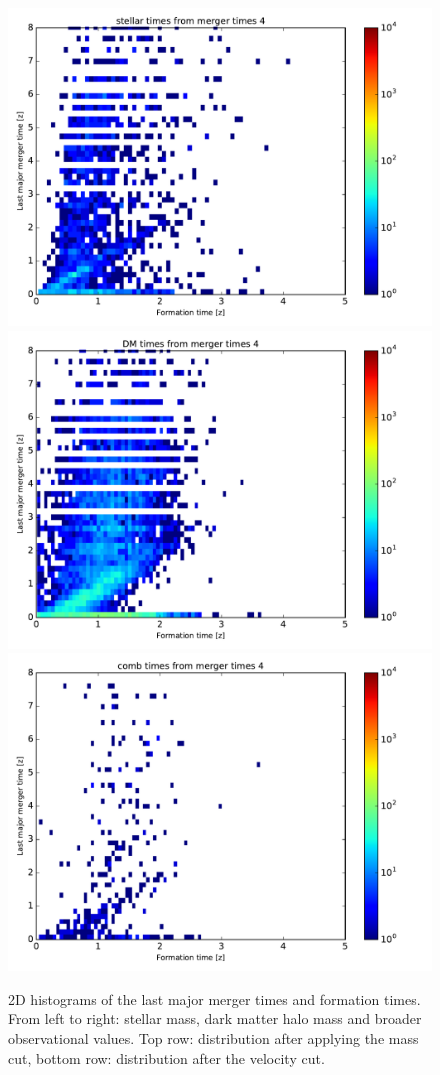 \documentclass[fleqn,usenatbib]{mnras}
\begin{document}
\begin{figure}
\includegraphics[scale=0.27]{avgProp/stellar_2DhistTimes_4.pdf}
\includegraphics[scale=0.27]{avgProp/DM_2DhistTimes_4.pdf}
\includegraphics[scale=0.27]{avgProp/comb_2DhistTimes_4.pdf}
\caption{\label{fig:2d_times} 2D histograms of the last major merger times and formation times. From left to right: stellar mass, dark matter halo mass and broader observational values. Top row: distribution after applying the mass cut, bottom row: distribution after the velocity cut.}
\end{figure}







\end{document}
